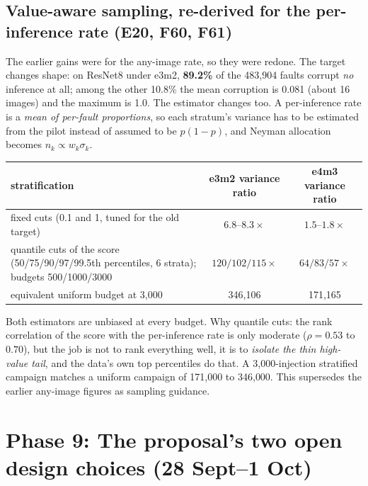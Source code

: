 \subsection{Value-aware sampling, re-derived for the per-inference rate (E20, F60, F61)}
The earlier gains were for the any-image rate, so they were redone. The target changes shape: on ResNet8 under e3m2, \textbf{89.2\%} of the 483{,}904 faults corrupt \emph{no} inference at all; among the other 10.8\% the mean corruption is 0.081 (about 16 images) and the maximum is 1.0.
The estimator changes too. A per-inference rate is a \emph{mean of per-fault proportions}, so each stratum's variance has to be estimated from the pilot instead of assumed to be $p(1-p)$, and Neyman allocation becomes $n_k\propto w_k\sigma_k$.
\begin{center}
\small
\begin{tabular}{p{6.6cm}cc}
\toprule
stratification & e3m2 variance ratio & e4m3 variance ratio \\
\midrule
fixed cuts (0.1 and 1, tuned for the old target) & $6.8$--$8.3\times$ & $1.5$--$1.8\times$ \\
quantile cuts of the score (50/75/90/97/99.5th percentiles, 6 strata); budgets 500/1000/3000 & $120/102/115\times$ & $64/83/57\times$ \\
equivalent uniform budget at 3{,}000 & 346{,}106 & 171{,}165 \\
\bottomrule
\end{tabular}
\end{center}
Both estimators are unbiased at every budget. Why quantile cuts: the rank correlation of the score with the per-inference rate is only moderate ($\rho=0.53$ to $0.70$), but the job is not to rank everything well, it is to \emph{isolate the thin high-value tail}, and the data's own top percentiles do that. A 3{,}000-injection stratified campaign matches a uniform campaign of 171{,}000 to 346{,}000.
This supersedes the earlier any-image figures as sampling guidance.

\section{Phase 9: The proposal's two open design choices (28 Sept--1 Oct)}

